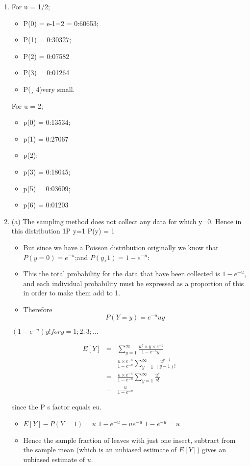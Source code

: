 \documentclass[a4paper,12pt]{article}
\begin{document}
\begin{enumerate}
    \item  For u = 1/2; 
    
\begin{itemize}   
\item P(0) = e-1=2 = 0:60653; 
\item P(1) = 0:30327; 
\item P(2) = 0:07582
\item P(3) =
0:01264
\item P(¸ 4)very small.
\end{itemize}

For u = 2; 
\begin{itemize}   
\item p(0) = 0:13534; 
\item p(1) = 0:27067 
\item p(2); 
\item p(3) = 0:18045; 
\item p(5) = 0:03609; 
\item p(6) = 0:01203
\end{itemize}
\item  (a) The sampling method does not collect any data for which y=0. Hence in this distribution
1P
y=1
P(y) = 1
\begin{itemize}
\item But since we have a Poisson distribution originally we know that $P(y = 0) =
e^{-u}$;and $P(y ¸ 1) = 1 - e^{-u}$:
\item This the total probability for the data that have been collected is $1-e^{-u}$, and each
individual probability must be expressed as a proportion of this in order to make
them add to 1.
\item 
Therefore \[P(Y = y) = e^{-u}uy\]
\end{itemize}

$(1-e^{-u})y! for y = 1; 2; 3; \ldots$


\begin{eqnarray*}
E[Y] &=& 
\sum^{\infty}_{y=1} \frac{u^{y} \times y \times e^{-y} }{1-e^{-u}y!}\\
&=& \frac{u\times e^{-u}}{1-e^{-u}} \sum^{\infty}_{y=1} \frac{u^{y-1} }{(y-1)!}\\
&=& \frac{u \times e^{-u}}{1-e^{-u}} \sum^{\infty}_{y=1} \frac{u^{s} }{s!}\\
&=& \frac{u}{1-e^{-u}}
\end{eqnarray*}

 since the
P
s factor
equals eu.
\begin{itemize}
\item $E[Y ] - P(Y = 1) = u$
$1-e^{-u} - ue^{-u}$
$1-e^{-u} = u$
\item Hence the sample fraction of leaves with just one insect, subtract from the sample
mean (which is an unbiased estimate of $E[Y]$) gives an unbiased estimate of $u$.
\end{itemize}
\end{enumerate}
\end{document}
